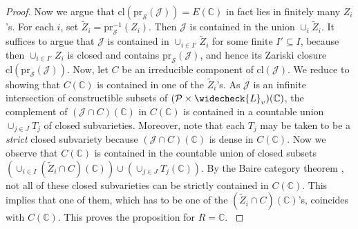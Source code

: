 \documentclass[letter, 11pt]{article}
\theoremstyle{plain}
\theoremstyle{definition}
\newcommand{\IC}{\mathbb{C}}
\newcommand{\che}[1]{\widecheck{#1}}
\newcommand{\<}{\langle}
\renewcommand{\>}{\rangle}
\def\wt{\widetilde}
\newcommand{\sJ}{\mathcal{J}}
\newcommand{\sS}{\mathcal{S}}
\newcommand{\sP}{\mathcal{P}}
\newcommand{\pr}{\mathrm{pr}}
\newcommand{\cl}{\mathrm{cl}}
\newcommand{\mpr}{}
\begin{document}
\begin{proof}
\mpr{Now we argue that $\cl(\pr_\sS (\sJ)) = E(\IC)$ in fact lies in finitely many $Z_i$'s. For each $i$, set $\wt{Z}_i = \pr_\sS^{-1}(Z_i)$. Then $\sJ$ is contained in the union $\cup_i \wt{Z}_i$. It suffices to argue that $\sJ$ is contained in $\cup_{i \in I'} \wt{Z}_{i}$ for some finite $I' \subseteq I$, because then $\cup_{i \in I'} Z_i$ is closed and contains $\pr_\sS(\sJ)$, and hence its Zariski closure $\cl(\pr_\sS(\sJ))$. Now, let $C$ be an irreducible component of $\cl(\sJ)$. We reduce to showing that $C(\IC)$ is contained in one of the $\wt{Z}_i$'s. As $\sJ$ is an infinite intersection of constructible subsets of $(\sP \times \che{L}_v)(\IC)$, the complement of $(\sJ \cap C)(\IC)$ in $C(\IC)$ is contained in a countable union $\cup_{j \in J} T_j$ of closed subvarieties. Moreover, note that each $T_j$ may be taken to be a \textit{strict} closed subvariety because $(\sJ \cap C)(\IC)$ is dense in $C(\IC)$. Now we observe that $C(\IC)$ is contained in the countable union of closed subsets $(\cup_{i \in I} (\wt{Z}_i \cap C)(\IC)) \cup (\cup_{j \in J} T_j(\IC))$. By the Baire category theorem \cite[\href{https://stacks.math.columbia.edu/tag/0CQN}{Tag 0CQN}]{stacks-project}, not all of these closed subvarieties can be strictly contained in $C(\IC)$. This implies that one of them, which has to be one of the $(\wt{Z}_i \cap C)(\IC)$'s, coincides with $C(\IC)$. This proves the proposition for $R = \IC$.  }





\end{proof}
\end{document}
